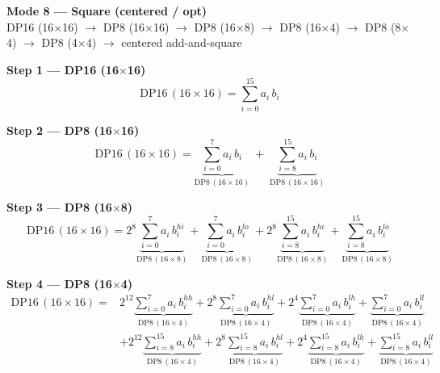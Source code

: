\documentclass[fleqn]{article}
\newcommand{\DPop}[3]{\mathrm{DP#1}\,(#2\!\times\!#3)}
\begin{document}
\begin{center}
{\LARGE \textbf{Mode 8 --- Square (centered / opt)}}\\[4pt]
{\large DP16 (16$\times$16) $\rightarrow$ DP8 (16$\times$16) $\rightarrow$ DP8 (16$\times$8) $\rightarrow$ DP8 (16$\times$4) $\rightarrow$ DP8 (8$\times$4) $\rightarrow$ DP8 (4$\times$4) $\rightarrow$ centered add-and-square}
\end{center}

\vspace{0.1em}

\textbf{Step 1 --- DP16 (16$\times$16)}
\[
\DPop{16}{16}{16} = \sum_{i=0}^{15} a_i \, b_i
\]

\textbf{Step 2 --- DP8 (16$\times$16)}
\[
\DPop{16}{16}{16}
  = \underbrace{\sum_{i=0}^{7} a_i \, b_i}_{\DPop{8}{16}{16}}
  \; + \; \underbrace{\sum_{i=8}^{15} a_i \, b_i}_{\DPop{8}{16}{16}}
\]

\textbf{Step 3 --- DP8 (16$\times$8)}
\[
\DPop{16}{16}{16}
  = 2^{8} \underbrace{\sum_{i=0}^{7} a_i \, b_i^{hi}}_{\DPop{8}{16}{8}}
  + \underbrace{\sum_{i=0}^{7} a_i \, b_i^{lo}}_{\DPop{8}{16}{8}}
  + 2^{8} \underbrace{\sum_{i=8}^{15} a_i \, b_i^{hi}}_{\DPop{8}{16}{8}}
  + \underbrace{\sum_{i=8}^{15} a_i \, b_i^{lo}}_{\DPop{8}{16}{8}}
\]

\textbf{Step 4 --- DP8 (16$\times$4)}
\begin{align*}
\DPop{16}{16}{16} = {}
  & 2^{12} \underbrace{\sum_{i=0}^{7} a_i \, b_i^{hh}}_{\DPop{8}{16}{4}}
  + 2^{8} \underbrace{\sum_{i=0}^{7} a_i \, b_i^{hl}}_{\DPop{8}{16}{4}}
  + 2^{4} \underbrace{\sum_{i=0}^{7} a_i \, b_i^{lh}}_{\DPop{8}{16}{4}}
  + \underbrace{\sum_{i=0}^{7} a_i \, b_i^{ll}}_{\DPop{8}{16}{4}} \\[1em]
  & + 2^{12} \underbrace{\sum_{i=8}^{15} a_i \, b_i^{hh}}_{\DPop{8}{16}{4}}
  + 2^{8} \underbrace{\sum_{i=8}^{15} a_i \, b_i^{hl}}_{\DPop{8}{16}{4}}
  + 2^{4} \underbrace{\sum_{i=8}^{15} a_i \, b_i^{lh}}_{\DPop{8}{16}{4}}
  + \underbrace{\sum_{i=8}^{15} a_i \, b_i^{ll}}_{\DPop{8}{16}{4}}
\end{align*}
\end{document}
